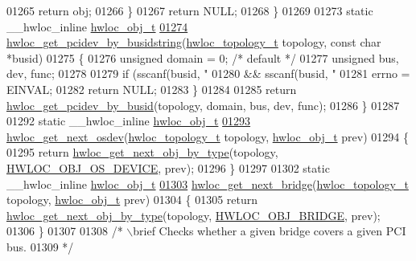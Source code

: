 \begin{DoxyCode}
{{01265       \textcolor{keywordflow}{return} obj;
01266   \}
01267   \textcolor{keywordflow}{return} NULL;
01268 \}
01269 
01273 \textcolor{keyword}{static} \_\_hwloc\_inline \hyperlink{a00016}{hwloc_obj_t}
\hypertarget{a00031_source_l01274}{}\hyperlink{a00064_ga9d5643f2e337fe1b98e7cce5c1ecb74e}{01274} \hyperlink{a00064_ga9d5643f2e337fe1b98e7cce5c1ecb74e}{hwloc_get_pcidev_by_busidstring}(\hyperlink{a00039_ga9d1e76ee15a7dee158b786c30b6a6e38}{hwloc_topology_t} topology, \textcolor{keyword}{const} \textcolor{keywordtype}{char} *busid)
01275 \{
01276   \textcolor{keywordtype}{unsigned} domain = 0; \textcolor{comment}{/* default */}
01277   \textcolor{keywordtype}{unsigned} bus, dev, func;
01278 
01279   \textcolor{keywordflow}{if} (sscanf(busid, \textcolor{stringliteral}{"%
01280       && sscanf(busid, \textcolor{stringliteral}{"%
01281     errno = EINVAL;
01282     \textcolor{keywordflow}{return} NULL;
01283   \}
01284 
01285   \textcolor{keywordflow}{return} \hyperlink{a00064_ga546e1d690c63fb24177f3013ed78ceb1}{hwloc_get_pcidev_by_busid}(topology, domain, bus, dev, func);
01286 \}
01287 
01292 \textcolor{keyword}{static} \_\_hwloc\_inline \hyperlink{a00016}{hwloc_obj_t}
\hypertarget{a00031_source_l01293}{}\hyperlink{a00064_ga73a5bc6265642e6001f7a10812ab886d}{01293} \hyperlink{a00064_ga73a5bc6265642e6001f7a10812ab886d}{hwloc_get_next_osdev}(\hyperlink{a00039_ga9d1e76ee15a7dee158b786c30b6a6e38}{hwloc_topology_t} topology, \hyperlink{a00016}{hwloc_obj_t} prev)
01294 \{
01295   \textcolor{keywordflow}{return} \hyperlink{a00053_ga5f08ceb69375341e73563cfe2e77534e}{hwloc_get_next_obj_by_type}(topology, \hyperlink{a00041_ggacd37bb612667dc437d66bfb175a8dc55a51e7280240fd9f25589cbbe538bdb075}{HWLOC_OBJ_OS_DEVICE}, prev);
01296 \}
01297 
01302 \textcolor{keyword}{static} \_\_hwloc\_inline \hyperlink{a00016}{hwloc_obj_t}
\hypertarget{a00031_source_l01303}{}\hyperlink{a00064_ga2bd3f856d0fc3c6c02642c17d763b823}{01303} \hyperlink{a00064_ga2bd3f856d0fc3c6c02642c17d763b823}{hwloc_get_next_bridge}(\hyperlink{a00039_ga9d1e76ee15a7dee158b786c30b6a6e38}{hwloc_topology_t} topology, \hyperlink{a00016}{hwloc_obj_t} prev)
01304 \{
01305   \textcolor{keywordflow}{return} \hyperlink{a00053_ga5f08ceb69375341e73563cfe2e77534e}{hwloc_get_next_obj_by_type}(topology, \hyperlink{a00041_ggacd37bb612667dc437d66bfb175a8dc55a6825f10895fea60aca7a6ba9fe273db0}{HWLOC_OBJ_BRIDGE}, prev);
01306 \}
01307 
01308 \textcolor{comment}{/* \(\backslash\)brief Checks whether a given bridge covers a given PCI bus.}
01309 \textcolor{comment}{ */}
}}}}
\end{DoxyCode}
